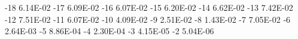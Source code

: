 -18	6.14E-02
-17	6.09E-02
-16	6.07E-02
-15	6.20E-02
-14	6.62E-02
-13	7.42E-02
-12	7.51E-02
-11	6.07E-02
-10	4.09E-02
-9	2.51E-02
-8	1.43E-02
-7	7.05E-02
-6	2.64E-03
-5	8.86E-04
-4	2.30E-04
-3	4.15E-05
-2	5.04E-06